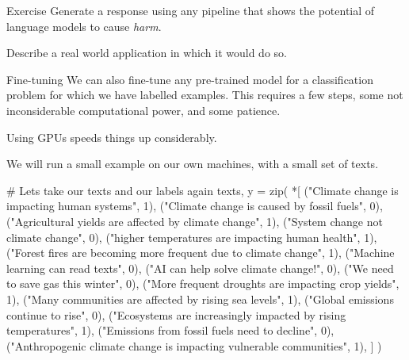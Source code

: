 \documentclass[
  10pt,
  ignorenonframetext,
  aspectratio=169]{beamer}
\newenvironment{Shaded}{\begin{snugshade}}{\end{snugshade}}
\newcommand{\BuiltInTok}[1]{\textcolor[rgb]{0.80,0.80,0.80}{#1}}
\newcommand{\CommentTok}[1]{\textcolor[rgb]{0.50,0.62,0.50}{#1}}
\newcommand{\DecValTok}[1]{\textcolor[rgb]{0.86,0.86,0.80}{#1}}
\newcommand{\NormalTok}[1]{\textcolor[rgb]{0.80,0.80,0.80}{#1}}
\newcommand{\OperatorTok}[1]{\textcolor[rgb]{0.94,0.94,0.82}{#1}}
\newcommand{\StringTok}[1]{\textcolor[rgb]{0.80,0.58,0.58}{#1}}
\begin{document}
\begin{frame}{Exercise}
\protect\hypertarget{exercise}{}
Generate a response using any pipeline that shows the potential of
language models to cause \emph{harm}.

Describe a real world application in which it would do so.
\end{frame}

\begin{frame}[fragile]{Fine-tuning}
\protect\hypertarget{fine-tuning}{}
We can also fine-tune any pre-trained model for a classification problem
for which we have labelled examples. This requires a few steps, some not
inconsiderable computational power, and some patience.

Using GPUs speeds things up considerably.

We will run a small example on our own machines, with a small set of
texts.

\medskip

\scriptsize

\begin{Shaded}
\begin{Highlighting}[]
\CommentTok{\# Let\textquotesingle{}s take our texts and our labels again}
\NormalTok{texts, y }\OperatorTok{=} \BuiltInTok{zip}\NormalTok{(}
    \OperatorTok{*}\NormalTok{[}
\NormalTok{        (}\StringTok{"Climate change is impacting human systems"}\NormalTok{, }\DecValTok{1}\NormalTok{),}
\NormalTok{        (}\StringTok{"Climate change is caused by fossil fuels"}\NormalTok{, }\DecValTok{0}\NormalTok{),}
\NormalTok{        (}\StringTok{"Agricultural yields are affected by climate change"}\NormalTok{, }\DecValTok{1}\NormalTok{),}
\NormalTok{        (}\StringTok{"System change not climate change"}\NormalTok{, }\DecValTok{0}\NormalTok{),}
\NormalTok{        (}\StringTok{"higher temperatures are impacting human health"}\NormalTok{, }\DecValTok{1}\NormalTok{),}
\NormalTok{        (}\StringTok{"Forest fires are becoming more frequent due to climate change"}\NormalTok{, }\DecValTok{1}\NormalTok{),}
\NormalTok{        (}\StringTok{"Machine learning can read texts"}\NormalTok{, }\DecValTok{0}\NormalTok{),}
\NormalTok{        (}\StringTok{"AI can help solve climate change!"}\NormalTok{, }\DecValTok{0}\NormalTok{),}
\NormalTok{        (}\StringTok{"We need to save gas this winter"}\NormalTok{, }\DecValTok{0}\NormalTok{),}
\NormalTok{        (}\StringTok{"More frequent droughts are impacting crop yields"}\NormalTok{, }\DecValTok{1}\NormalTok{),}
\NormalTok{        (}\StringTok{"Many communities are affected by rising sea levels"}\NormalTok{, }\DecValTok{1}\NormalTok{),}
\NormalTok{        (}\StringTok{"Global emissions continue to rise"}\NormalTok{, }\DecValTok{0}\NormalTok{),}
\NormalTok{        (}\StringTok{"Ecosystems are increasingly impacted by rising temperatures"}\NormalTok{, }\DecValTok{1}\NormalTok{),}
\NormalTok{        (}\StringTok{"Emissions from fossil fuels need to decline"}\NormalTok{, }\DecValTok{0}\NormalTok{),}
\NormalTok{        (}\StringTok{"Anthropogenic climate change is impacting vulnerable communities"}\NormalTok{, }\DecValTok{1}\NormalTok{),}
\NormalTok{    ]}
\NormalTok{)}
\end{Highlighting}
\end{Shaded}
\end{frame}
\end{document}

